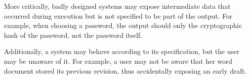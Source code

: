 More critically, badly designed systems may expose intermediate data that occurred during execution but is not specified to be part of the output.
For example, when choosing a password, the output should only the cryptographic hash of the password, not the password itself.

Additionally, a system may behave according to its specification, but the user may be unaware of it.
For example, a user may not be aware that her word document stored its previous revision, thus accidentally exposing an early draft.